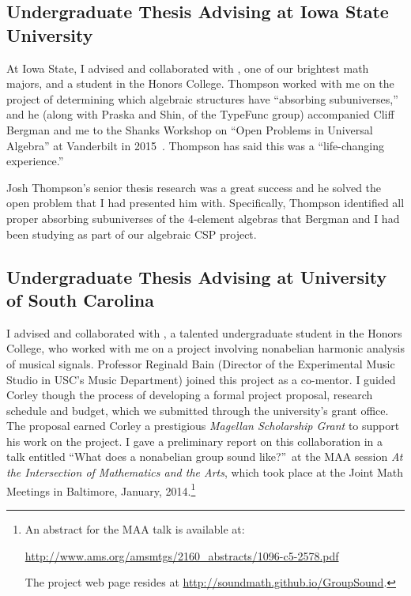 \bigskip

\subsection{Undergraduate Thesis Advising at Iowa State University} At Iowa State, I advised and collaborated with , one of our brightest math majors, and a student in the Honors College. Thompson worked with me on the project of determining which algebraic structures have ``absorbing subuniverses,'' and he (along with Praska and Shin, of the TypeFunc group) accompanied Cliff Bergman and me to the Shanks Workshop on ``Open Problems in Universal Algebra'' at Vanderbilt in 2015~\cite{Shanks}.  Thompson has said this was a ``life-changing experience.''

Josh Thompson's senior thesis research was a great success and he solved the open problem that I had presented him with. Specifically, Thompson identified all proper absorbing subuniverses of the 4-element algebras that Bergman and I had been studying as part of our algebraic CSP project.

\bigskip

\subsection{Undergraduate Thesis Advising at University of South Carolina}
I advised and collaborated with , a talented undergraduate student in the Honors College, who worked with me on a project involving nonabelian harmonic analysis of musical signals. Professor Reginald Bain (Director of the Experimental Music Studio in USC's Music Department) joined this project as a co-mentor. I guided Corley though the process of developing a formal project proposal, research schedule and budget, which we submitted through the university's grant office. The proposal earned Corley a prestigious \emph{Magellan Scholarship Grant} to support his work on the project. I gave a preliminary report on this collaboration in a talk entitled ``What does a nonabelian group sound like?''~at the MAA session \emph{At the Intersection of Mathematics and the Arts}, which took place at the Joint Math Meetings in Baltimore, January, 2014.\footnote{An abstract for the MAA talk is available at:

  \url{http://www.ams.org/amsmtgs/2160_abstracts/1096-c5-2578.pdf}

The project web page resides at \url{http://soundmath.github.io/GroupSound}.}

